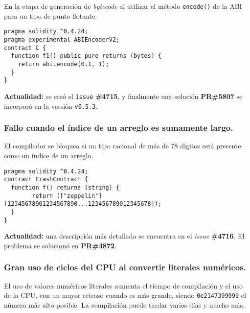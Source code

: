 En la etapa de generación de \textit{bytecode} al utilizar el método \texttt{encode()} de la ABI para un tipo de punto flotante.\\

\begin{lstlisting}[language=Solidity, caption={Código de ejemplo con el método \texttt{encode()}}]
pragma solidity ^0.4.24;
pragma experimental ABIEncoderV2;
contract C {
  function f1() public pure returns (bytes) {
    return abi.encode(0.1, 1);
  }
}
\end{lstlisting}

\textbf{Actualidad:} se creó el \texttt{issue} \textbf{\#4715}\cite{GHI4715}, y finalmente una solución \textbf{PR\#5807}\cite{GHPR5807} se incorporó en la versión \texttt{v0.5.3}.\\

\subsubsection{Fallo cuando el índice de un arreglo es sumamente largo.}

El compilador se bloquea si un tipo racional de más de 78 dígitos está presente como un índice de un arreglo.\\

\begin{lstlisting}[language=Solidity, caption={Código de ejemplo 78 dígitos}]
pragma solidity ^0.4.24;
contract CrashContract {
  function f() returns (string) {
        return (["zeppelin"][12345678901234567890...123456789012345678]);
  }
}
\end{lstlisting}

\textbf{Actualidad:} una descripción más detallada se encuentra en el \textit{issue} \textbf{\#4716}\cite{GHI4716}. El problema se solucionó en \textbf{PR\#4872}\cite{GHPR4872}.\\

\subsubsection{Gran uso de ciclos del CPU al convertir literales numéricos.}

El uso de valores numéricos literales aumenta el tiempo de compilación y el uso de la CPU, con un mayor retraso cuando es más grande, siendo \texttt{0e2147399999} el número más alto posible. La compilación puede tardar varios días y mucho más.\\


